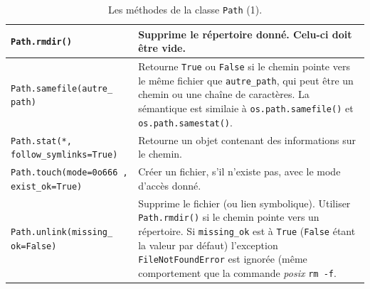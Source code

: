 \documentclass[a4paper,11pt]{book}
\begin{document}
\begin{table}[h]
\begin{center}
\begin{tabular}{|p{4cm}|p{10.5cm}|}
\hline
\texttt{Path.rmdir()} & Supprime le répertoire donné. Celu-ci doit être vide. \\
\hline
\texttt{Path.samefile(autre\_ path)} & Retourne \texttt{True} ou \texttt{False} si le chemin pointe vers le même fichier que \texttt{autre\_path}, qui peut être un chemin ou une chaîne de caractères. La sémantique est similaie à \texttt{os.path.samefile()} et \texttt{os.path.samestat()}. \\
\hline
\texttt{Path.stat(*, follow\_symlinks=True)} & Retourne un objet contenant des informations sur le chemin. \\
\hline
\texttt{Path.touch(mode=0o666
, exist\_ok=True)} & Créer un fichier, s'il n'existe pas, avec le mode d'accès donné. \\
\hline
\texttt{Path.unlink(missing\_
ok=False)} & Supprime le fichier (ou lien symbolique). Utiliser \texttt{Path.rmdir()} si le chemin pointe vers un répertoire. Si \texttt{missing\_ok} est à \texttt{True} (\texttt{False} étant la valeur par défaut) l'exception \texttt{FileNotFoundError} est ignorée (même comportement que la commande \textit{posix} \texttt{rm -f}. \\
\hline
\end{tabular}
\caption{Les méthodes de la classe \texttt{Path} (1).}
\end{center}
\end{table}
\medskip
\end{document}
